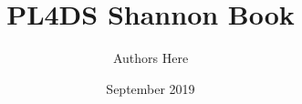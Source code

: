 \begin{titlepage}
	\author{Authors Here}
	\title{PL4DS Shannon Book}
	\date{September 2019}
	
\end{titlepage}